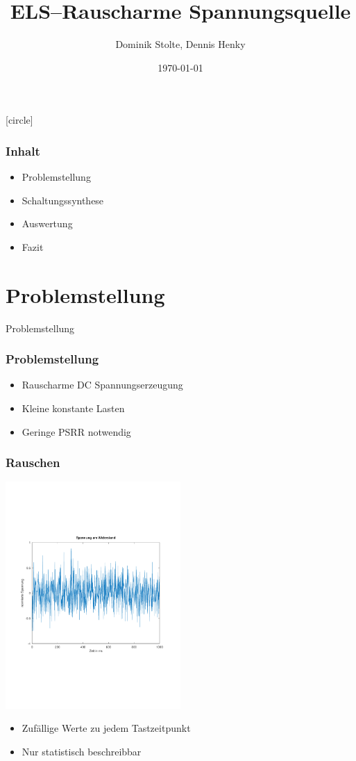 \documentclass[aspectratio=32]{beamer}
\title{ELS--Rauscharme Spannungsquelle}
\author{Dominik Stolte, Dennis Henky}
\institute[{HS Mannheim}]{HS Mannheim}
\date{\today}
\begin{document}
 
[circle]

\begin{frame}
  \titlepage{}
\end{frame}

\begin{frame}
  \frametitle{Inhalt}
  \begin{itemize}
    \item Problemstellung
    \item Schaltungssynthese
    \item Auswertung
    \item Fazit
  \end{itemize}
\end{frame}

\section{Problemstellung}
{
  \logo{}
  \begin{frame}
    \centering
    \Large{Problemstellung}
  \end{frame}
}

\begin{frame}
  \frametitle{Problemstellung}
  \centering
  \begin{itemize}
    \item Rauscharme DC Spannungserzeugung
    \item Kleine konstante Lasten
    \item Geringe PSRR notwendig
  \end{itemize}
\end{frame}

\begin{frame}
  \frametitle{Rauschen}
  \centering
  \includegraphics[width=0.5\textwidth]{../common/Simulation/rauschen/spannung.pdf}
  \begin{itemize}
    \item Zufällige Werte zu jedem Tastzeitpunkt
    \item Nur statistisch beschreibbar
  \end{itemize}
\end{frame}
\end{document}
